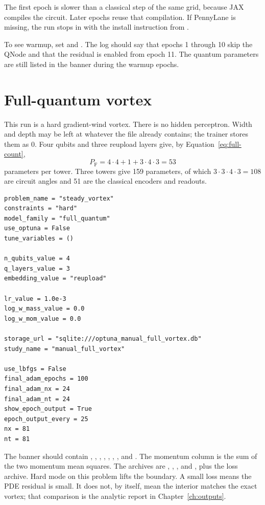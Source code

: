 The first epoch is slower than a classical step of the same grid, because JAX compiles the circuit.
Later epochs reuse that compilation.
If PennyLane is missing, the run stops in  with the install instruction from .

To see warmup, set  and .
The log should say that epochs 1 through 10 skip the QNode and that the residual is enabled from epoch 11.
The quantum parameters are still listed in the banner during the warmup epochs.

\section{Full-quantum vortex}
\label{ex:full}

This run is a hard gradient-wind vortex.
There is no hidden perceptron.
Width and depth may be left at whatever the file already contains; the trainer stores them as 0.
Four qubits and three reupload layers give, by Equation~\eqref{eq:full-count},
\[
P_{\mathrm{F}} = 4\cdot 4 + 1 + 3\cdot 4\cdot 3 = 53
\]
parameters per tower.
Three towers give 159 parameters, of which \(3\cdot 3\cdot 4\cdot 3 = 108\) are circuit angles and 51 are the classical encoders and readouts.

\begin{lstlisting}
problem_name = "steady_vortex"
constraints = "hard"
model_family = "full_quantum"
use_optuna = False
tune_variables = ()

n_qubits_value = 4
q_layers_value = 3
embedding_value = "reupload"

lr_value = 1.0e-3
log_w_mass_value = 0.0
log_w_mom_value = 0.0

storage_url = "sqlite:///optuna_manual_full_vortex.db"
study_name = "manual_full_vortex"

use_lbfgs = False
final_adam_epochs = 100
final_adam_nx = 24
final_adam_nt = 24
show_epoch_output = True
epoch_output_every = 25
nx = 81
nt = 81
\end{lstlisting}

The banner should contain , , , , , , , and .
The momentum column is the sum of the two momentum mean squares.
The archives are , , , and , plus the loss archive.
Hard mode on this problem lifts the boundary.
A small loss means the PDE residual is small.
It does not, by itself, mean the interior matches the exact vortex; that comparison is the analytic report in Chapter~\ref{ch:outputs}.

